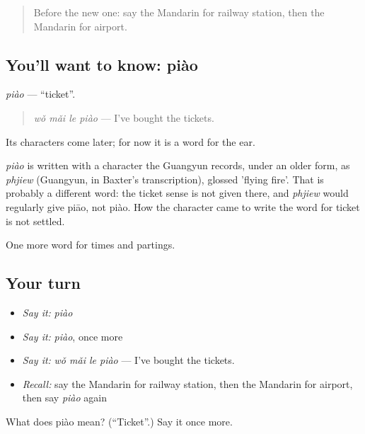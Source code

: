 \begin{quote}
Before the new one: say the Mandarin for railway station, then the Mandarin for airport.
\end{quote}

\subsection*{You'll want to know: piào}
\emph{piào} — \textquotedblleft{}ticket\textquotedblright{}.

\begin{quote}
\emph{wǒ mǎi le piào} — I've bought the tickets.
\end{quote}

Its characters come later; for now it is a word for the ear.

\begin{cousinweb}
\emph{piào} is written with a character the Guangyun records, under an older form, as \emph{phjiew} (Guangyun, in Baxter's transcription), glossed 'flying fire'. That is probably a different word: the ticket sense is not given there, and \emph{phjiew} would regularly give piāo, not piào. How the character came to write the word for ticket is not settled.
\end{cousinweb}

\begin{grammarlens}[title={What you've built}]
One more word for times and partings.
\end{grammarlens}

\subsection*{Your turn}
\begin{itemize}
\raggedright
  \item \emph{Say it:} \emph{piào}
  \item \emph{Say it:} \emph{piào}, once more
  \item \emph{Say it:} \emph{wǒ mǎi le piào} — I've bought the tickets.
  \item \emph{Recall:} say the Mandarin for railway station, then the Mandarin for airport, then say \emph{piào} again
\end{itemize}

\begin{tcolorbox}[breakable,colback=teal!4,colframe=teal!35!black,title={Before you move on}]
What does piào mean? (\textquotedblleft{}Ticket\textquotedblright{}.) Say it once more.
\end{tcolorbox}
